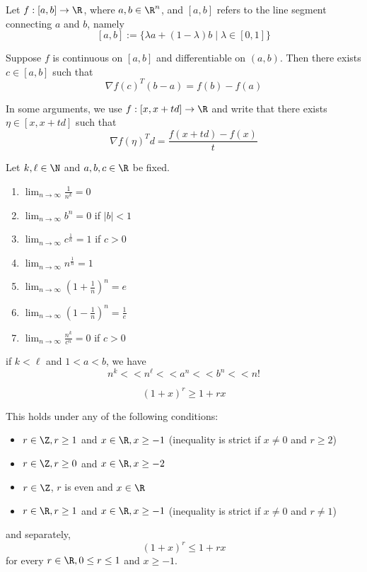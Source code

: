 Let $f:[a,b]\to\R$, where $a,b\in\R^n$, and $[a,b]$ refers to the line
segment connecting $a$ and $b$, namely
$$
	[a,b]:=\{\lambda a+(1-\lambda)b\mid\lambda\in[0,1]\}
$$

Suppose $f$ is continuous on $[a,b]$ and differentiable on $(a,b)$.
Then there exists $c\in[a,b]$ such that
$$
	\nabla f(c)^T(b-a)=f(b)-f(a)
$$

In some arguments, we use $f:[x,x+td]\to\R$ and write that there
exists $\eta\in[x,x+td]$ such that
$$
	\nabla f(\eta)^Td=\frac{f(x+td)-f(x)}t
$$

\label{ffc8953}

Let $k,\ell\in\N$ and $a,b,c\in\R$ be fixed.
\begin{enumerate}[label=(\alph*)]
	\def\li{\displaystyle\lim_{n\to\infty}}
	\item $\li\frac1{n^k}=0$
	\item $\li b^n=0$ \quad if \quad $|b|<1$
	\item $\li c^{\frac1n}=1$ \quad if \quad $c>0$
	\item $\li n^{\frac1n}=1$
	\item $\li \left(1+\frac1n\right)^n=e$
	\item $\li \left(1-\frac1n\right)^n=\frac1e$
	\item $\li \frac{n^k}{c^n}=0$ \quad if \quad $c>0$
\end{enumerate}

if $k<\ell$ and $1<a<b$, we have
$$
	n^k << n^\ell << a^n << b^n << n!
$$

\label{d44713f}
$$
	(1+x)^r\geq 1+rx
$$

This holds under any of the following conditions:
\begin{itemize}
	\item $r\in\Z,r\geq1$ and $x\in\R,x\geq-1$ (inequality is strict if
	      $x\neq0$ and $r\geq2$)
	\item $r\in\Z,r\geq0$ and $x\in\R,x\geq-2$
	\item $r\in\Z$, $r$ is even and $x\in\R$
	\item $r\in\R,r\geq1$ and $x\in\R,x\geq-1$ (inequality is strict if
	      $x\neq0$ and $r\neq1$)
\end{itemize}

and separately,
$$
	(1+x)^r\leq 1+rx
$$
for every $r\in\R,0\leq r\leq 1$ and $x\geq-1$.

\label{ccfddb1}

